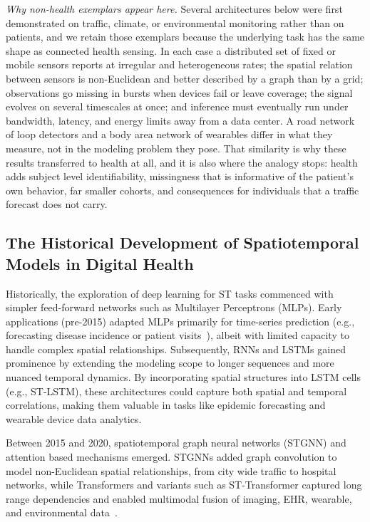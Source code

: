 \documentclass[journal]{IEEEtran}
\begin{document}
\emph{Why non-health exemplars appear here.} Several architectures below were first demonstrated on traffic, climate, or environmental monitoring rather than on patients, and we retain those exemplars because the underlying task has the same shape as connected health sensing. In each case a distributed set of fixed or mobile sensors reports at irregular and heterogeneous rates; the spatial relation between sensors is non-Euclidean and better described by a graph than by a grid; observations go missing in bursts when devices fail or leave coverage; the signal evolves on several timescales at once; and inference must eventually run under bandwidth, latency, and energy limits away from a data center. A road network of loop detectors and a body area network of wearables differ in what they measure, not in the modeling problem they pose. That similarity is why these results transferred to health at all, and it is also where the analogy stops: health adds subject level identifiability, missingness that is informative of the patient's own behavior, far smaller cohorts, and consequences for individuals that a traffic forecast does not carry.

\subsection{The Historical Development of Spatiotemporal Models in Digital Health}
Historically, the exploration of deep learning for ST tasks commenced with simpler feed-forward networks such as Multilayer Perceptrons (MLPs). Early applications (pre-2015) adapted MLPs primarily for time-series prediction (e.g., forecasting disease incidence or patient visits~\cite{miotto2018deeplearning}), albeit with limited capacity to handle complex spatial relationships. Subsequently, RNNs and LSTMs gained prominence by extending the modeling scope to longer sequences and more nuanced temporal dynamics. By incorporating spatial structures into LSTM cells (e.g., ST-LSTM), these architectures could capture both spatial and temporal correlations, making them valuable in tasks like epidemic forecasting and wearable device data analytics.

Between 2015 and 2020, spatiotemporal graph neural networks (STGNN) and attention based mechanisms emerged. STGNNs added graph convolution to model non-Euclidean spatial relationships, from city wide traffic to hospital networks, while Transformers and variants such as ST-Transformer captured long range dependencies and enabled multimodal fusion of imaging, EHR, wearable, and environmental data~\cite{caroprese2018deepehr}.
\end{document}
